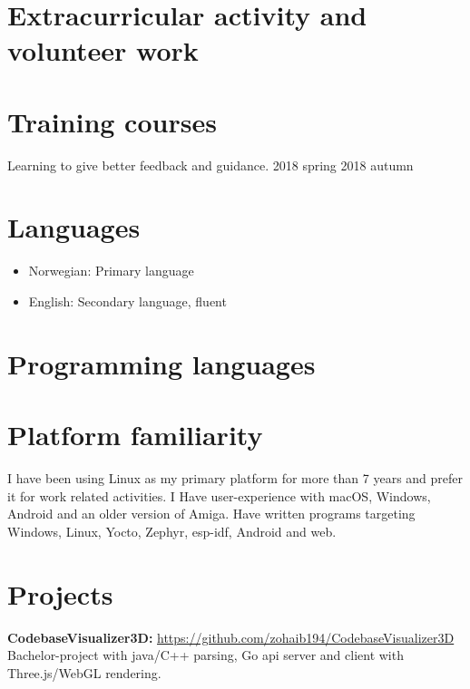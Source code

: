 \documentclass[british]{../crudecv/crudecv}
\begin{document}
\section*{Extracurricular activity and volunteer work}
\begin{experiences}
\end{experiences}

\section*{Training courses}
\begin{experiences}
  {
    Learning to give better feedback and guidance.
  }{
    2018 spring
  }{
    2018 autumn
  }
\end{experiences}

\section*{Languages}
\begin{itemize}
\item Norwegian: Primary language
\item English: Secondary language, fluent
\end{itemize}


\section*{Programming languages}
\begin{skills}
\end{skills}


\section*{Platform familiarity}
I have been using Linux as my primary platform for more than 7 years and
prefer it for work related activities. I Have user-experience with macOS,
Windows, Android and an older version of Amiga. Have written programs
targeting Windows, Linux, Yocto, Zephyr, esp-idf, Android and web.

\section*{Projects}
\textbf{CodebaseVisualizer3D:} \hfill \href{https://github.com/zohaib194/CodebaseVisualizer3D}{https://github.com/zohaib194/CodebaseVisualizer3D} \\
Bachelor-project with java/C++ parsing, Go api server and client with Three.js/WebGL rendering.
\end{document}

